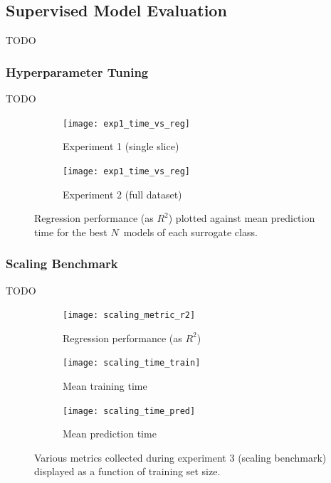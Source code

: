 \subsection{Supervised Model Evaluation}
\label{sec:modelres}

TODO

\subsubsection{Hyperparameter Tuning}

TODO

\begin{figure}[h]
	\centering
	\begin{subfigure}[b]{0.5\textwidth}
		\centering
		\texttt{[image: exp1\_time\_vs\_reg]}
		\caption{Experiment 1 (single slice)}
	\end{subfigure}\hfill%
	\begin{subfigure}[b]{0.5\textwidth}
		\centering
		\texttt{[image: exp1\_time\_vs\_reg]}
		\caption{Experiment 2 (full dataset)}
	\end{subfigure}
	\caption{Regression performance (as $R^2$) plotted against mean
	prediction time for the best $N$~models of each surrogate class.} %
	\label{fig:time-vs-reg}
\end{figure}


\subsubsection{Scaling Benchmark}

TODO

\begin{figure}[h]
	\centering
	\begin{subfigure}[b]{0.333\textwidth}
		\centering
		\texttt{[image: scaling\_metric\_r2]}
		\caption{Regression performance (as $R^2$)}
	\end{subfigure}\hfill%
	\begin{subfigure}[b]{0.333\textwidth}
		\centering
		\texttt{[image: scaling\_time\_train]}
		\caption{Mean training time}
	\end{subfigure}\hfill%
	\begin{subfigure}[b]{0.333\textwidth}
		\centering
		\texttt{[image: scaling\_time\_pred]}
		\caption{Mean prediction time}
	\end{subfigure}
	\caption{Various metrics collected during experiment 3 (scaling
	benchmark) displayed as a function of training set size.}
	\label{fig:scaling}
\end{figure}

